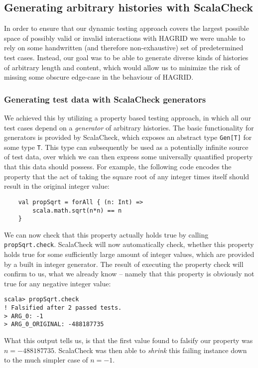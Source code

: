 
\newpage

\subsection{Generating arbitrary histories with ScalaCheck}
In order to ensure that our dynamic testing approach covers the largest possible space of possibly valid or invalid interactions with HAGRID we were unable to rely on some handwritten (and therefore non-exhaustive) set of predetermined test cases. Instead, our goal was to be able to generate diverse kinds of histories of arbitrary length and content, which would allow us to minimize the risk of missing some obscure edge-case in the behaviour of HAGRID.

\subsubsection{Generating test data with ScalaCheck generators}
We achieved this by utilizing a property based testing approach, in which all our test cases depend on a \emph{generator} of arbitrary histories. The basic functionality for generators is provided by ScalaCheck, which exposes an abstract type \texttt{Gen[T]} for some type \texttt{T}. This type can subsequently be used as a potentially infinite source of test data, over which we can then express some universally quantified property that this data should possess.
For example, the following code encodes the property that the act of taking the square root of any integer times itself should result in the original integer value: 
\begin{verbatim}
    val propSqrt = forAll { (n: Int) => 
        scala.math.sqrt(n*n) == n 
    }
\end{verbatim}

We can now check that this property actually holds true by calling \texttt{propSqrt.check}. 
ScalaCheck will now automatically check, whether this property holds true for some sufficiently large amount of integer values, which are provided by a built in integer generator. The result of executing the property check will confirm to us, what we already know -- namely that this property is obviously not true for any negative integer value: 
\begin{verbatim}
scala> propSqrt.check
! Falsified after 2 passed tests.
> ARG_0: -1
> ARG_0_ORIGINAL: -488187735
\end{verbatim} 
What this output tells us, is that the first value found to falsify our property was \(n=-488187735\). ScalaCheck was then able to \emph{shrink} this failing instance down to the much simpler case of \(n=-1\).

